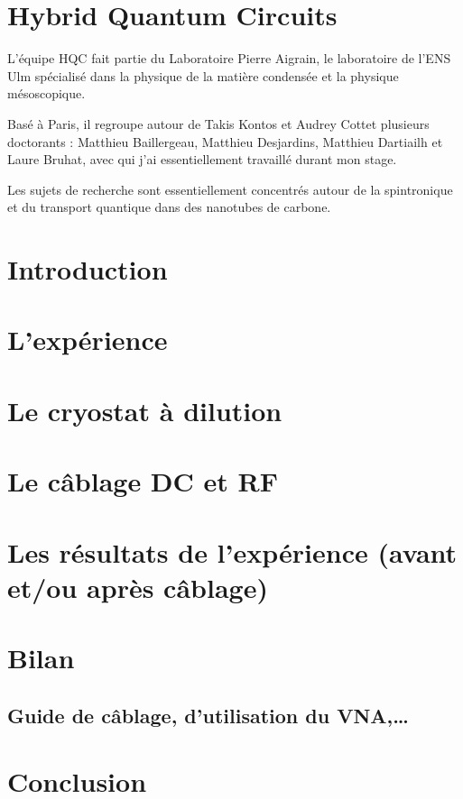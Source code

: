 \documentclass[a4paper,12pt]{report}
\date{}
\title{}
\author{}
\begin{document}
\nocite{*}




\chapter*{Hybrid Quantum Circuits}
L'équipe HQC fait partie du Laboratoire Pierre Aigrain, le laboratoire de l'ENS Ulm spécialisé dans la physique de la matière condensée et la physique mésoscopique.

Basé à Paris, il regroupe autour de Takis Kontos et Audrey Cottet plusieurs doctorants : Matthieu Baillergeau, Matthieu Desjardins, Matthieu Dartiailh et Laure Bruhat, avec qui j'ai essentiellement travaillé durant mon stage.

Les sujets de recherche sont essentiellement concentrés autour de la spintronique et du transport quantique dans des nanotubes de carbone.

\chapter*{Introduction} %


\chapter{L'expérience}


\chapter{Le cryostat à dilution}


\chapter{Le câblage DC et RF}


\chapter{Les résultats de l'expérience (avant et/ou après câblage)}

\chapter{Bilan}
\section{Guide de câblage, d'utilisation du VNA,…}
\chapter*{Conclusion}
%






\end{document}
